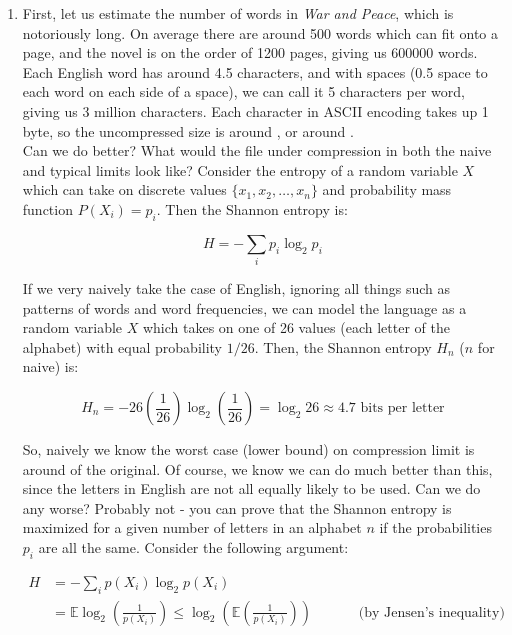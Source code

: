\documentclass[12pt]{article}
\newcommand{\E}{\mathbb{E}}
\begin{document}
\begin{enumerate}
\item First, let us estimate the number of words in \textit{War and Peace}, which is notoriously long. On average there are around 500 words which can fit onto a page, and the novel is on the order of 1200 pages, giving us 600000 words. Each English word has around 4.5 characters, and with spaces (0.5 space to each word on each side of a space), we can call it 5 characters per word, giving us 3 million characters. Each character in ASCII encoding takes up 1 byte, so the uncompressed size is around , or around .\\

Can we do better? What would the file under compression in both the naive and typical limits look like? Consider the entropy of a random variable $X$ which can take on discrete values $\{x_1, x_2, \ldots, x_n\}$ and probability mass function $P(X_i) = p_i$. Then the Shannon entropy is:

\begin{equation*}
H = -\sum_i p_i \log_2 p_i
\end{equation*}

If we very naively take the case of English, ignoring all things such as patterns of words and word frequencies, we can model the language as a random variable $X$ which takes on one of 26 values (each letter of the alphabet) with equal probability $1/26$. Then, the Shannon entropy $H_n$ ($n$ for naive) is:

\begin{equation*}
H_n = -26\left(\frac{1}{26}\right)\log_2\left(\frac{1}{26}\right) = \log_2 26 \approx 4.7 \textrm{ bits per letter}
\end{equation*}

So, naively we know the worst case (lower bound) on compression limit is around  of the original. Of course, we know we can do much better than this, since the letters in English are not all equally likely to be used. Can we do any worse? Probably not - you can prove that the Shannon entropy is maximized for a given number of letters in an alphabet $n$ if the probabilities $p_i$ are all the same. Consider the following argument:

\begin{align*}
H &= -\sum_i p(X_i) \log_2 p(X_i)\\
&= \E\log_2\left(\frac{1}{p(X_i)}\right) \leq \log_2\left(\E\left(\frac{1}{p(X_i)}\right)\right) \hspace{3em}\textrm{ (by Jensen's inequality)}\\
\end{align*}


\end{enumerate}
\end{document}
